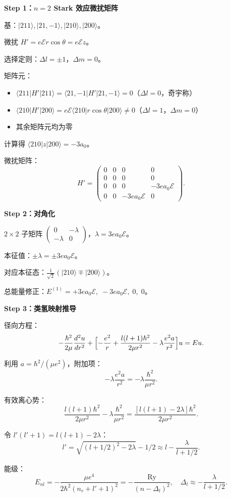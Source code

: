 \begin{derivationbox}
\textbf{Step 1：$n=2$ Stark 效应微扰矩阵}

基：$|211\rangle,|21,-1\rangle,|210\rangle,|200\rangle$。

微扰 $H'=e\mathcal{E}r\cos\theta=e\mathcal{E}z$。

选择定则：$\Delta l=\pm1$，$\Delta m=0$。

矩阵元：
\begin{itemize}[nosep]
    \item $\langle211|H'|211\rangle=\langle21,-1|H'|21,-1\rangle=0$（$\Delta l=0$，奇宇称）
    \item $\langle210|H'|200\rangle=e\mathcal{E}\langle210|r\cos\theta|200\rangle\neq0$（$\Delta l=1$，$\Delta m=0$）
    \item 其余矩阵元均为零
\end{itemize}

计算得 $\langle210|z|200\rangle=-3a_0$。

微扰矩阵：
\[
H'=\begin{pmatrix}0&0&0&0\\0&0&0&0\\0&0&0&-3ea_0\mathcal{E}\\0&0&-3ea_0\mathcal{E}&0\end{pmatrix}.
\]

\textbf{Step 2：对角化}

$2\times2$ 子矩阵 $\begin{pmatrix}0&-\lambda\\-\lambda&0\end{pmatrix}$，$\lambda=3ea_0\mathcal{E}$。

本征值：$\pm\lambda=\pm3ea_0\mathcal{E}$。

对应本征态：$\frac{1}{\sqrt2}(|210\rangle\mp|200\rangle)$。

总能量修正：$E^{(1)}=+3ea_0\mathcal{E},\;-3ea_0\mathcal{E},\;0,\;0$。

\textbf{Step 3：类氢映射推导}

径向方程：
\[
-\frac{\hbar^2}{2\mu}\frac{d^2u}{dr^2}+\Bigl[-\frac{e^2}{r}+\frac{l(l+1)\hbar^2}{2\mu r^2}-\lambda\frac{e^2a}{r^2}\Bigr]u=Eu.
\]

利用 $a=\hbar^2/(\mu e^2)$，附加项：
\[
-\lambda\frac{e^2a}{r^2}=-\lambda\frac{\hbar^2}{\mu r^2}.
\]

有效离心势：
\[
\frac{l(l+1)\hbar^2}{2\mu r^2}-\lambda\frac{\hbar^2}{\mu r^2}=\frac{[l(l+1)-2\lambda]\hbar^2}{2\mu r^2}.
\]

令 $l'(l'+1)=l(l+1)-2\lambda$：
\[
l'=\sqrt{(l+1/2)^2-2\lambda}-1/2\approx l-\frac{\lambda}{l+1/2}.
\]

能级：
\[
E_{nl}=-\frac{\mu e^4}{2\hbar^2(n_r+l'+1)^2}=-\frac{\text{Ry}}{(n-\Delta_l)^2},
\quad\Delta_l\approx-\frac{\lambda}{l+1/2}.
\]
\end{derivationbox}

\vspace{1em}

